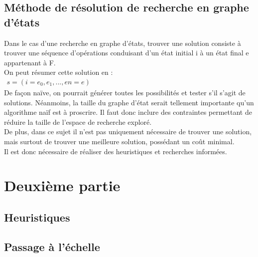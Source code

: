 \documentclass[french]{article}
\begin{document}
\subsection{Méthode de résolution de recherche en graphe d’états}
\noindent
Dans le cas d’une recherche en graphe d’états, trouver une solution consiste à trouver une séquence d’opérations conduisant d’un état initial i à un état final e appartenant à F.\\
On peut résumer cette solution en :\\
$\displaystyle\begin{matrix}
s =(i=e_{0},e_{1}, ... ,e{n}=e)
\end{matrix}$\\
De façon naïve, on pourrait générer toutes les possibilités et tester s’il s’agit de solutions. Néanmoins, la taille du graphe d’état serait tellement importante qu’un algorithme naïf est à proscrire. Il faut donc inclure des contraintes permettant de réduire la taille de l’espace de recherche exploré.\\
De plus, dans ce sujet il n’est pas uniquement nécessaire de trouver une solution, mais surtout de trouver une meilleure solution, possédant un coût minimal.\\
Il est donc nécessaire de réaliser des heuristiques et recherches informées.\\

\section{Deuxième partie}
\subsection{Heuristiques}
\subsection{Passage à l'échelle}
\end{document}
